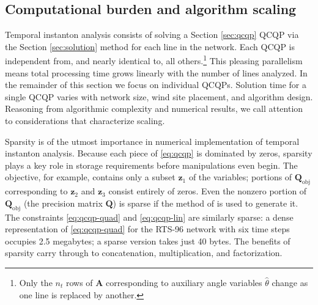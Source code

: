 \documentclass[journal,twoside]{IEEEtran}
\renewcommand{\vec}[1]{\mathbf{#1}}
\begin{document}
\subsection{Computational burden and algorithm scaling}
Temporal instanton analysis consists of solving a Section \ref{sec:qcqp} QCQP via the Section \ref{sec:solution} method for each line in the network. Each QCQP is independent from, and nearly identical to, all others.\footnote{Only the $n_t$ rows of $\mathbf{A}$ corresponding to auxiliary angle variables $\hat{\theta}$ change as one line is replaced by another.} This pleasing parallelism means total processing time grows linearly with the number of lines analyzed. In the remainder of this section we focus on individual QCQPs.
Solution time for a single QCQP varies with network size, wind site placement, and algorithm design.
Reasoning from algorithmic complexity and numerical results, we call attention to considerations that characterize scaling.

Sparsity is of the utmost importance in numerical implementation of temporal instanton analysis. Because each piece of \eqref{eq:qcqp} is dominated by zeros, sparsity plays a key role in storage requirements before manipulations even begin. The objective, for example, contains only a subset $\vec{z}_1$ of the variables; portions of $\mathbf{Q}_\text{obj}$ corresponding to $\vec{z}_2$ and $\vec{z}_3$ consist entirely of zeros. Even the nonzero portion of $\mathbf{Q}_\text{obj}$ (the precision matrix $\mathbf{Q}$) is sparse if the method of \cite{tastu2015} is used to generate it. The constraints \eqref{eq:qcqp-quad} and \eqref{eq:qcqp-lin} are similarly sparse: a dense representation of \eqref{eq:qcqp-quad} for the RTS-96 network with six time steps occupies 2.5 megabytes; a sparse version takes just 40 bytes. The benefits of sparsity carry through to concatenation, multiplication, and factorization.
\end{document}
